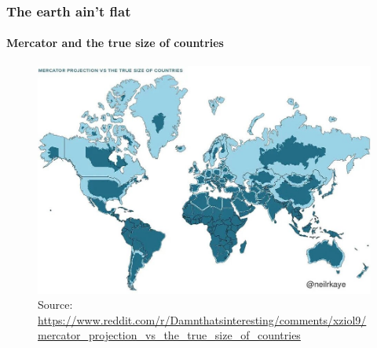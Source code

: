 \documentclass[
  shownotes,
  xcolor={svgnames},
  hyperref={colorlinks,citecolor=DarkBlue,linkcolor=andesred,urlcolor=DarkBlue}
  , aspectratio=169]{beamer}
\begin{document}
\begin{frame}[fragile]
\frametitle{The earth ain't flat}
\framesubtitle{Mercator and the true size of countries}


\begin{figure}[H] \centering
            \captionsetup{justification=centering}
                \includegraphics[scale=0.3]{figures/mercator_true_size.jpeg}
                \\
                \tiny
                Source: \url{https://www.reddit.com/r/Damnthatsinteresting/comments/xziol9/mercator_projection_vs_the_true_size_of_countries}
 \end{figure}


\end{frame}
\end{document}
